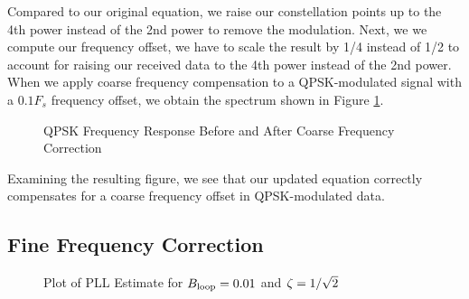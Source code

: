 \documentclass{article}
\begin{document}
\noindent Compared to our original equation, we raise our constellation points up to the 4th power instead of the 2nd power to remove the modulation. Next, we we compute our frequency offset, we have to scale the result by 1/4 instead of 1/2 to account for raising our received data to the 4th power instead of the 2nd power. When we apply coarse frequency compensation to a QPSK-modulated signal with a $0.1F_s$ frequency offset, we obtain the spectrum shown in Figure \ref{fig::psd_qpsk_with_cfc}.
 
\begin{figure}[H]
	\centerline{}
	\caption{QPSK Frequency Response Before and After Coarse Frequency Correction}
	\label{fig::psd_qpsk_with_cfc}
\end{figure}

\noindent Examining the resulting figure, we see that our updated equation correctly compensates for a coarse frequency offset in QPSK-modulated data.

\subsection{Fine Frequency Correction}

\begin{figure}[H]
	\centerline{}
	\caption{Plot of PLL Estimate for $\protect{B_\text{loop}} = 0.01$ and $\protect{\zeta = 1/\sqrt{2}}$}
	\label{fig::convergence_Bloop_0p01_damp_sqrt_2}
\end{figure}
\end{document}
